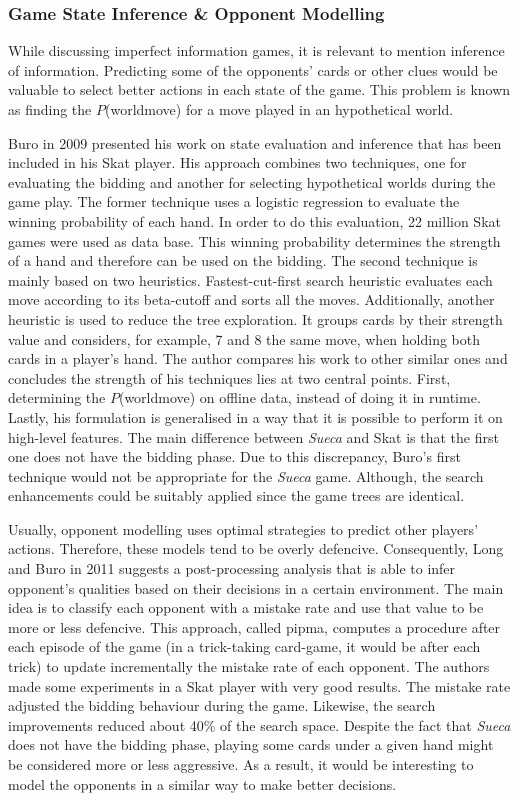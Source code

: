 \subsubsection{Game State Inference \& Opponent Modelling}


While discussing imperfect information games, it is relevant to mention inference of information.
Predicting some of the opponents' cards or other clues would be valuable to select better actions in each state of the game.
This problem is known as finding the $P$(world\textbar move) for a move played in an hypothetical world.


Buro in 2009 \cite{Buro} presented his work on state evaluation and inference that has been included in his Skat player.
His approach combines two techniques, one for evaluating the bidding and another for selecting hypothetical worlds during the game play.
The former technique uses a logistic regression to evaluate the winning probability of each hand.
In order to do this evaluation, 22 million Skat games were used as data base.
This winning probability determines the strength of a hand and therefore can be used on the bidding.
The second technique is mainly based on two heuristics.
Fastest-cut-first search heuristic evaluates each move according to its beta-cutoff and sorts all the moves.
Additionally, another heuristic is used to reduce the tree exploration.
It groups cards by their strength value and considers, for example, 7 and 8 the same move, when holding both cards in a player's hand.
The author compares his work to other similar ones and concludes the strength of his techniques lies at two central points.
First, determining the $P$(world\textbar move) on offline data, instead of doing it in runtime.
Lastly, his formulation is generalised in a way that it is possible to perform it on high-level features.
The main difference between \emph{Sueca} and Skat is that the first one does not have the bidding phase.
Due to this discrepancy, Buro's first technique would not be appropriate for the \emph{Sueca} game.
Although, the search enhancements could be suitably applied since the game trees are identical.


Usually, opponent modelling uses optimal strategies to predict other players' actions.
Therefore, these models tend to be overly defencive.
Consequently, Long and Buro in 2011 \cite{Long2009} suggests a post-processing analysis that is able to infer opponent's qualities based on their decisions in a certain environment.
The main idea is to classify each opponent with a mistake rate and use that value to be more or less defencive.
This approach, called \gls{pipma}, computes a procedure after each episode of the game (in a trick-taking card-game, it would be after each trick) to update incrementally the mistake rate of each opponent.
The authors made some experiments in a Skat player with very good results.
The mistake rate adjusted the bidding behaviour during the game.
Likewise, the search improvements reduced about 40\% of the search space.
Despite the fact that \emph{Sueca} does not have the bidding phase, playing some cards under a given hand might be considered more or less aggressive.
As a result, it would be interesting to model the opponents in a similar way to make better decisions.


